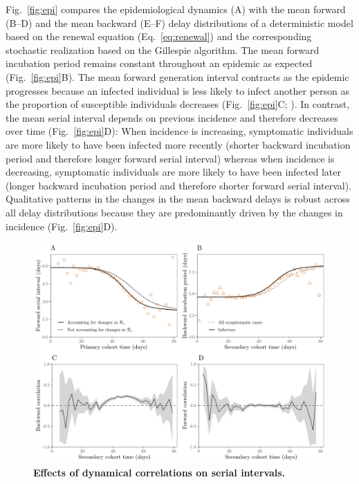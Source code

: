 \documentclass[12pt]{article}
\newcommand{\eref}[1]{Eq.~\ref{eq:#1}}
\newcommand{\fref}[1]{Fig.~\ref{fig:#1}}
\begin{document}
\fref{epi} compares the epidemiological dynamics (A) with the mean forward (B--D) and the mean backward (E--F) delay distributions of a deterministic model based on the renewal equation (\eref{renewal}) and the corresponding stochastic realization based on the Gillespie algorithm.
The mean forward incubation period remains constant throughout an epidemic as expected (\fref{epi}B).
The mean forward generation interval contracts as the epidemic progresses because an infected individual is less likely to infect another person as the proportion of susceptible individuals decreases (\fref{epi}C; \cite{champredon2015intrinsic}).
In contrast, the mean serial interval depends on previous incidence and therefore decreases over time (\fref{epi}D):
When incidence is increasing, symptomatic individuals are more likely to have been infected more recently (shorter backward incubation period and therefore longer forward serial interval) whereas when incidence is decreasing, symptomatic individuals are more likely to have been infected later (longer backward incubation period and therefore shorter forward serial interval).
Qualitative patterns in the changes in the mean backward delays is robust across all delay distributions because they are predominantly driven by the changes in incidence (\fref{epi}D).

\begin{figure}[!th]
\includegraphics[width=\textwidth]{forward_tease.pdf}
\caption{
\textbf{Effects of dynamical correlations on serial intervals.}
}
\label{fig:tease}
\end{figure}
\end{document}
